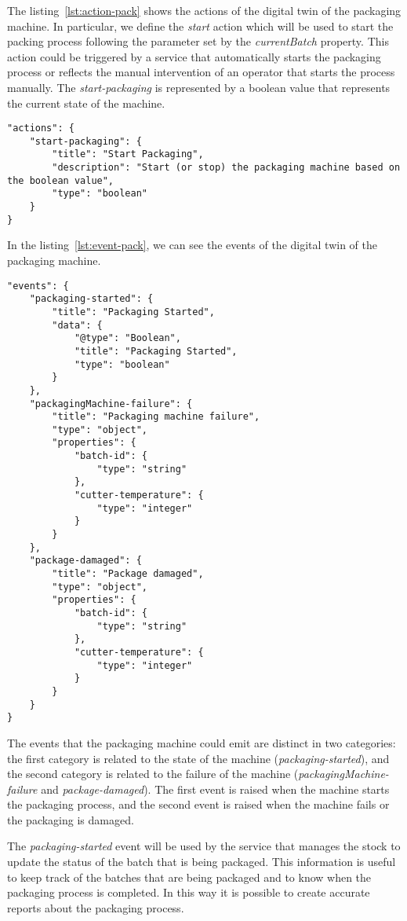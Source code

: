 The listing~\ref{lst:action-pack} shows the actions of the digital twin of the packaging machine. In particular, we define the \textit{start} action
which will be used to start the packing process following the parameter set by the \textit{currentBatch} property.
This action could be triggered by a service that automatically starts the packaging process or reflects the manual intervention of an operator that starts the process manually.
The \textit{start-packaging} is represented by a boolean value that represents the current state of the machine.

\begin{lstlisting}[caption={Actions of the packaging machine Thing Model.},label={lst:action-pack}]
"actions": {
	"start-packaging": {
		"title": "Start Packaging",
		"description": "Start (or stop) the packaging machine based on the boolean value",
		"type": "boolean"
	}
}
\end{lstlisting}

\newpage

In the listing~\ref{lst:event-pack}, we can see the events of the digital twin of the packaging machine.

\begin{lstlisting}[caption={Events of the packaging machine Thing Model.},label={lst:event-pack}]
"events": {
	"packaging-started": {
		"title": "Packaging Started",
		"data": {
			"@type": "Boolean",
			"title": "Packaging Started",
			"type": "boolean"
		}
	},
	"packagingMachine-failure": {
		"title": "Packaging machine failure",
		"type": "object",
		"properties": {
			"batch-id": {
				"type": "string"
			},
			"cutter-temperature": {
				"type": "integer"
			}
		}
	},
	"package-damaged": {
		"title": "Package damaged",
		"type": "object",
		"properties": {
			"batch-id": {
				"type": "string"
			},
			"cutter-temperature": {
				"type": "integer"
			}
		}
	}
}
\end{lstlisting}

The events that the packaging machine could emit are distinct in two categories: the first category is related to the state of the machine (\textit{packaging-started}), and the second category is related to the failure of the machine (\textit{packagingMachine-failure} and \textit{package-damaged}). The first event is raised when the machine starts the packaging process, and the second event is raised when the machine fails or the packaging is damaged.

The \textit{packaging-started} event will be used by the service that manages the stock to update the status of the batch that is being packaged.
This information is useful to keep track of the batches that are being packaged and to know when the packaging process is completed. In this way it
is possible to create accurate reports about the packaging process.

